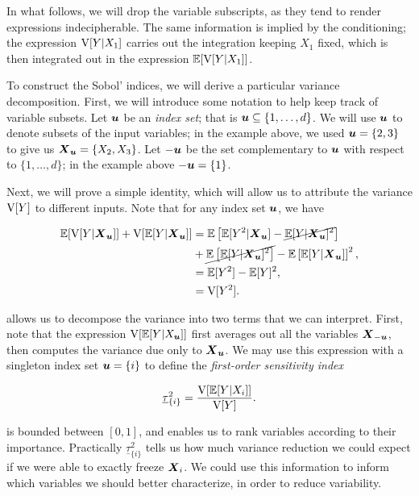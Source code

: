 \documentclass{article}
\begin{document}
In what follows, we will drop the variable subscripts, as they tend to render
expressions indecipherable. The same information is implied by the conditioning;
the expression \(\mathrm{V}[Y|X_1]\) carries out the integration keeping \(X_1\) fixed,
which is then integrated out in the expression \(\mathbb{E}[\mathrm{V}[Y|X_1]]\).

To construct the Sobol' indices, we will derive a particular variance
decomposition. First, we will introduce some notation to help keep track of
variable subsets. Let \(\boldsymbol{u}\) be an \emph{index set}; that is
\(\boldsymbol{u}\subseteq\{1,\dots,d\}\). We will use \(\boldsymbol{u}\) to denote subsets of the
input variables; in the example above, we used \(\boldsymbol{u}=\{2,3\}\) to give us
\(\boldsymbol{X}_{\boldsymbol{u}}=\{X_2,X_3\}\). Let \(-\boldsymbol{u}\) be the set complementary to \(\boldsymbol{u}\) with
respect to \(\{1,\dots,d\}\); in the example above \(-\boldsymbol{u}=\{1\}\).

Next, we will prove a simple identity, which will allow us to attribute the
variance \(\mathrm{V}[Y]\) to different inputs. Note that for any index set \(\boldsymbol{u}\), we have

\begin{equation}\begin{aligned}\label{eq:var-decomp}
  \E[\V[Y|\mX_{\vu}]] + \V[\E[Y|\mX_{\vu}]] &= %
  \E\left[\E[Y^2|\mX_{\vu}] - \cancel{\E[Y|\mX_{\vu}]^2 }\right] \\
  &+ \cancel{\E\left[\E[Y|\mX_{\vu}]^2\right]} - \E\left[\E[Y|\mX_{\vu}]\right]^2, \\
  &= \E[Y^2] - \E[Y]^2, \\
  &= \V[Y^2].
\end{aligned}\end{equation}

\noindent {} allows us to decompose the variance into two
terms that we can interpret. First, note that the expression
\(\mathrm{V}[\mathbb{E}[Y|X_{\boldsymbol{u}}]]\) first averages out all the variables \(\boldsymbol{X}_{-\boldsymbol{u}}\), then
computes the variance due only to \(\boldsymbol{X}_{\boldsymbol{u}}\). We may use this expression with
a singleton index set \(\boldsymbol{u}=\{i\}\) to define the \emph{first-order sensitivity
  index}

\begin{equation}\label{eq:sobol-first}
  \underline{\tau}_{\{i\}}^2 = \frac{\mathrm{V}[\mathbb{E}[Y|X_i]]}{\mathrm{V}[Y]}.
\end{equation}

\noindent {} is bounded between \([0,1]\), and enables us to
rank variables according to their importance. Practically
\(\underline{\tau}_{\{i\}}^2\) tells us how much variance reduction we could
expect if we were able to exactly freeze \(\boldsymbol{X}_i\). We could use this information
to inform which variables we should better characterize, in order to reduce
variability.
\end{document}
